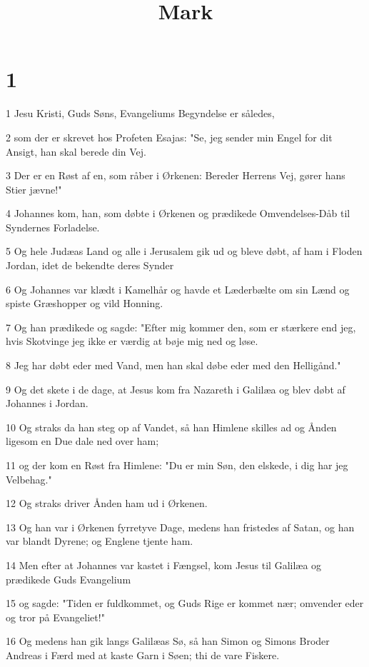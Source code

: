 

\title{Mark}


\chapter{1}

\par 1 Jesu Kristi, Guds Søns, Evangeliums Begyndelse er således,
\par 2 som der er skrevet hos Profeten Esajas: "Se, jeg sender min Engel for dit Ansigt, han skal berede din Vej.
\par 3 Der er en Røst af en, som råber i Ørkenen: Bereder Herrens Vej, gører hans Stier jævne!"
\par 4 Johannes kom, han, som døbte i Ørkenen og prædikede Omvendelses-Dåb til Syndernes Forladelse.
\par 5 Og hele Judæas Land og alle i Jerusalem gik ud og bleve døbt, af ham i Floden Jordan, idet de bekendte deres Synder
\par 6 Og Johannes var klædt i Kamelhår og havde et Læderbælte om sin Lænd og spiste Græshopper og vild Honning.
\par 7 Og han prædikede og sagde: "Efter mig kommer den, som er stærkere end jeg, hvis Skotvinge jeg ikke er værdig at bøje mig ned og løse.
\par 8 Jeg har døbt eder med Vand, men han skal døbe eder med den Helligånd."
\par 9 Og det skete i de dage, at Jesus kom fra Nazareth i Galilæa og blev døbt af Johannes i Jordan.
\par 10 Og straks da han steg op af Vandet, så han Himlene skilles ad og Ånden ligesom en Due dale ned over ham;
\par 11 og der kom en Røst fra Himlene: "Du er min Søn, den elskede, i dig har jeg Velbehag."
\par 12 Og straks driver Ånden ham ud i Ørkenen.
\par 13 Og han var i Ørkenen fyrretyve Dage, medens han fristedes af Satan, og han var blandt Dyrene; og Englene tjente ham.
\par 14 Men efter at Johannes var kastet i Fængsel, kom Jesus til Galilæa og prædikede Guds Evangelium
\par 15 og sagde: "Tiden er fuldkommet, og Guds Rige er kommet nær; omvender eder og tror på Evangeliet!"
\par 16 Og medens han gik langs Galilæas Sø, så han Simon og Simons Broder Andreas i Færd med at kaste Garn i Søen; thi de vare Fiskere.
